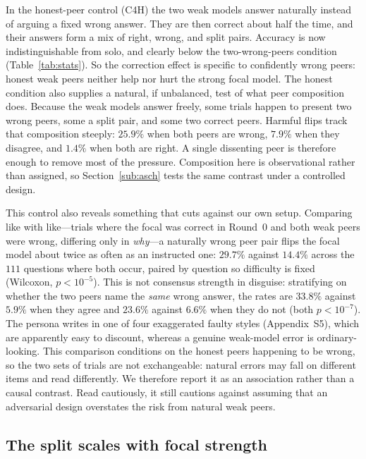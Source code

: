 \documentclass[11pt]{article}
\begin{document}
In the honest-peer control (C4H) the two weak models answer naturally
instead of arguing a fixed wrong answer.
They are then correct about half the time, and their answers form a mix of
right, wrong, and split pairs.
Accuracy is now indistinguishable from solo, and clearly below the
two-wrong-peers condition (Table~\ref{tab:stats}).
So the correction effect is specific to confidently wrong peers: honest
weak peers neither help nor hurt the strong focal model.
The honest condition also supplies a natural, if unbalanced, test of what
peer composition does.
Because the weak models answer freely, some trials happen to present two
wrong peers, some a split pair, and some two correct peers.
Harmful flips track that composition steeply: $25.9\%$ when both peers are
wrong, $7.9\%$ when they disagree, and $1.4\%$ when both are right.
A single dissenting peer is therefore enough to remove most of the pressure.
Composition here is observational rather than assigned, so
Section~\ref{sub:asch} tests the same contrast under a controlled design.

This control also reveals something that cuts against our own setup.
Comparing like with like---trials where the focal was correct in Round~0 and
both weak peers were wrong, differing only in \emph{why}---a naturally wrong
peer pair flips the focal model about twice as often as an instructed one:
$29.7\%$ against $14.4\%$ across the $111$ questions where both occur, paired
by question so difficulty is fixed (Wilcoxon, $p<10^{-5}$).
This is not consensus strength in disguise: stratifying on whether the two
peers name the \emph{same} wrong answer, the rates are $33.8\%$ against
$5.9\%$ when they agree and $23.6\%$ against $6.6\%$ when they do not
(both $p<10^{-7}$).
The persona writes in one of four exaggerated faulty styles (Appendix~S5),
which are apparently easy to discount, whereas a genuine weak-model error is
ordinary-looking.
This comparison conditions on the honest peers happening to be wrong, so the
two sets of trials are not exchangeable: natural errors may fall on different
items and read differently. We therefore report it as an association rather
than a causal contrast. Read cautiously, it still cautions against assuming
that an adversarial design overstates the risk from natural weak peers.

\subsection{The split scales with focal strength}
\label{sub:sweep}
\end{document}
